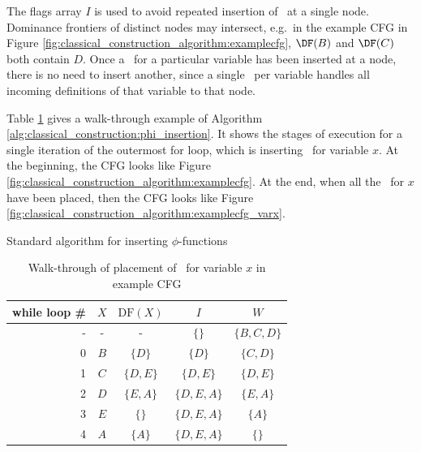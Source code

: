 The flags array $I$ is used to avoid repeated insertion of \phifuns\
at a single node. Dominance
frontiers
of distinct nodes may intersect, e.g.\ in the example CFG in Figure
\ref{fig:classical_construction_algorithm:examplecfg},
$\DF(B)$ and $\DF(C)$ both contain $D$. 
Once a \phifun\ for a particular variable has been
inserted at a node,
there is no need to insert another, since a single \phifun\ per
variable handles all incoming definitions of that variable to that node.

Table \ref{table:classical_construction:walkthru} 
gives a walk-through example of Algorithm 
\ref{alg:classical_construction:phi_insertion}.
It shows the stages of execution for a single iteration of
the outermost for loop, which is inserting \phifuns\
for variable $x$.
At the beginning, the CFG looks like Figure \ref{fig:classical_construction_algorithm:examplecfg}.
At the end, when all the \phifuns\ for $x$ have
been placed, then the CFG looks like Figure \ref{fig:classical_construction_algorithm:examplecfg_varx}.

\begin{algorithm}
\caption{\label{alg:classical_construction:phi_insertion}Standard algorithm for inserting $\phi$-functions}
\end{algorithm}


\begin{table}
\begin{center}
\begin{tabular}{r|c|c|c|c}
\textbf{while loop \#} & $X$ & $\textrm{DF}(X)$ & $I$         & $W$\\ \hline
-                      & -   & -                & $\{\}$      & $\{B,C,D\}$ \\
0                      & $B$ & $\{D\}$          & $\{D\}$     & $\{C,D\}$ \\
1                      & $C$ & $\{D,E\}$        & $\{D,E\}$   & $\{D,E\}$ \\
2                      & $D$ & $\{E,A\}$        & $\{D,E,A\}$ & $\{E,A\}$\\
3                      & $E$ & $\{\}$           & $\{D,E,A\}$ & $\{A\}$\\
4                      & $A$ & $\{A\}$          & $\{D,E,A\}$ & $\{\}$\\ \hline
\end{tabular}
\end{center}
\caption{\label{table:classical_construction:walkthru}Walk-through of
  placement of \phifuns\ for variable $x$ in example CFG}
\end{table}

